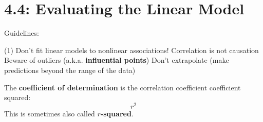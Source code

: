 \documentclass[../mathNotesPreamble]{subfiles}
\begin{document}
  \section{4.4: Evaluating the Linear Model}
    Guidelines:
    \begin{tasks}[after-item-skip=\stretch{1}, label=\textbullet](1)
      \task Don't fit linear models to nonlinear associations!
      \task Correlation is not causation
      \task Beware of outliers (a.k.a. \textbf{influential points})
      \task Don't extrapolate (make predictions beyond the range of the data)
    \end{tasks}

    \begin{defn*}
      The \textbf{coefficient of determination} is the correlation coefficient coefficient squared:
        \[r^2\]
      This is sometimes also called \textbf{$r$-squared}.
    \end{defn*}

  \pagebreak
\end{document}
